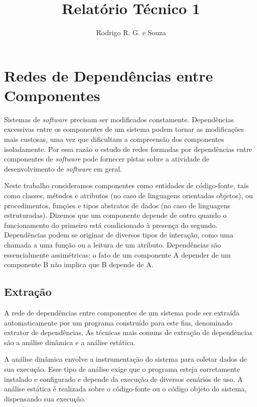 \documentclass{article}
\begin{document}
\title{Relatório Técnico 1}
\author{Rodrigo R. G. e Souza}
\maketitle

\section{Redes de Dependências entre Componentes}

Sistemas de \textit{software} precisam ser modificados constamente. Dependências excessivas entre os componentes de um sistema podem tornar as modificações mais custosas, uma vez que dificultam a compreensão dos componentes isoladamente. Por essa razão o estudo de redes formadas por dependências entre componentes de \textit{software} pode fornecer pistas sobre a atividade de desenvolvimento de \textit{software} em geral.

Neste trabalho consideramos componentes como entidades de código-fonte, tais como classes, métodos e atributos (no caso de linguagens orientadas objetos), ou procedimentos, funções e tipos abstratos de dados (no caso de linguagens estruturadas). Dizemos que um componente depende de outro quando o funcionamento do primeiro está condicionado à presença do segundo. Dependências podem se originar de diversos tipos de interação, como uma chamada a uma função ou a leitura de um atributo. Dependências são essencialmente assimétricas: o fato de um componente A depender de um componente B não implica que B depende de A.


\subsection{Extração}

A rede de dependências entre componentes de um sistema pode ser extraída automaticamente por um programa construído para este fim, denominado extrator de dependências. As técnicas mais comuns de extração de dependências são a análise dinâmica e a análise estática. 

A análise dinâmica envolve a instrumentação do sistema para coletar dados de sua execução. Esse tipo de análise exige que o programa esteja corretamente instalado e configurado e depende da execução de diversos cenários de uso. A análise estática é realizada sobre o código-fonte ou o código objeto do sistema, dispensando sua execução.
\end{document}
